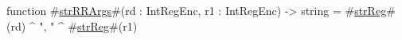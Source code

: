 function #\hyperref[sailMIPSzstrRRArgs]{strRRArgs}#(rd : IntRegEnc, r1 : IntRegEnc) -> string = #\hyperref[sailMIPSzstrReg]{strReg}#(rd) ^ ", " ^ #\hyperref[sailMIPSzstrReg]{strReg}#(r1)
